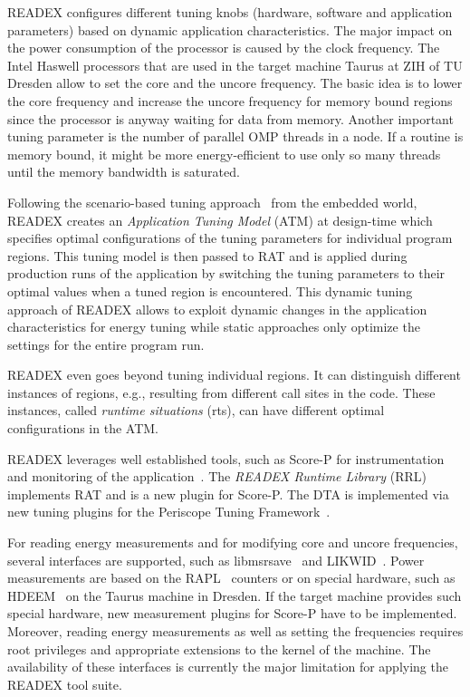 \documentclass[runningheads]{llncs}
\begin{document}
READEX configures different tuning knobs (hardware, software and application parameters) based on dynamic application characteristics. The major impact on the power consumption of the processor is caused by the clock frequency. The Intel Haswell processors that are used in the target machine Taurus at ZIH of TU Dresden allow to set the core and the uncore frequency. The basic idea is to lower the core frequency and increase the uncore frequency for memory bound regions since the processor is anyway waiting for data from memory. Another important tuning parameter is the number of parallel OMP threads in a node. If a routine is memory bound, it might be more energy-efficient to use only so many threads until the memory bandwidth is saturated.

Following the scenario-based tuning approach~\cite{filippopoulos2013exploration} from the embedded world, READEX creates an \textit{Application Tuning Model} (ATM) at design-time which specifies optimal configurations of the tuning parameters for individual program regions. This tuning model is then passed to RAT and is applied during production runs of the application by switching the tuning parameters to their optimal values when a tuned region is encountered. This dynamic tuning approach of READEX allows to exploit dynamic changes in the application characteristics for energy tuning while static approaches only optimize the settings for the entire program run. 

READEX even goes beyond tuning individual regions. It can distinguish different instances of regions, e.g., resulting from different call sites in the code. These instances, called \textit{runtime situations} (rts), can have different optimal configurations in the ATM. 

READEX leverages well established tools, such as Score-P for instrumentation and monitoring of the application~\cite{knupfer2012score}. The \textit{READEX Runtime Library} (RRL) implements RAT and is a new plugin for Score-P. The DTA is implemented via new tuning plugins for the Periscope Tuning Framework~\cite{PTF2.0IEEE2016}.  

For reading energy measurements and for modifying core and uncore frequencies, several interfaces are supported, such as libmsrsave~\cite{msrsave} and LIKWID~\cite{LIKWID}. Power measurements are based on the RAPL~\cite{Intel2018} counters or on special hardware, such as HDEEM~\cite{hdeem} on the Taurus machine in Dresden. If the target machine provides such special hardware, new measurement plugins for Score-P have to be implemented. Moreover, reading energy measurements as well as setting the frequencies requires root privileges and appropriate extensions to the kernel of the machine. The availability of these interfaces is currently the major limitation for applying the READEX tool suite. 
\end{document}

